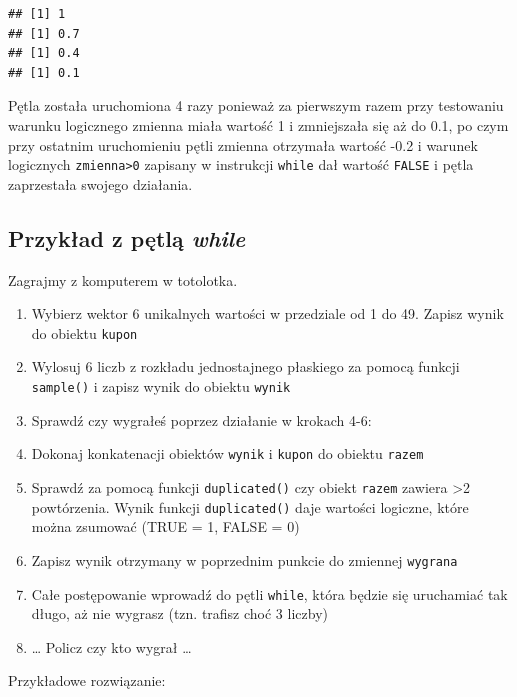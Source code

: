\documentclass[]{book}
\providecommand{\tightlist}{%
  \setlength{\itemsep}{0pt}\setlength{\parskip}{0pt}}
\theoremstyle{definition}
\theoremstyle{definition}
\theoremstyle{definition}
\theoremstyle{remark}
\begin{document}
\begin{verbatim}
## [1] 1
## [1] 0.7
## [1] 0.4
## [1] 0.1
\end{verbatim}

Pętla została uruchomiona 4 razy ponieważ za pierwszym razem przy
testowaniu warunku logicznego zmienna miała wartość 1 i zmniejszała się
aż do 0.1, po czym przy ostatnim uruchomieniu pętli zmienna otrzymała
wartość -0.2 i warunek logicznych \texttt{zmienna\textgreater{}0}
zapisany w instrukcji \texttt{while} dał wartość \texttt{FALSE} i pętla
zaprzestała swojego działania.

\subsection{\texorpdfstring{Przykład z pętlą
\emph{while}}{Przykład z pętlą while}}\label{przykad-z-petla-while}

Zagrajmy z komputerem w totolotka.

\begin{enumerate}
\def\labelenumi{\arabic{enumi}.}
\tightlist
\item
  Wybierz wektor 6 unikalnych wartości w przedziale od 1 do 49. Zapisz
  wynik do obiektu \texttt{kupon}
\item
  Wylosuj 6 liczb z rozkładu jednostajnego płaskiego za pomocą funkcji
  \texttt{sample()} i zapisz wynik do obiektu \texttt{wynik}
\item
  Sprawdź czy wygrałeś poprzez działanie w krokach 4-6:
\item
  Dokonaj konkatenacji obiektów \texttt{wynik} i \texttt{kupon} do
  obiektu \texttt{razem}
\item
  Sprawdź za pomocą funkcji \texttt{duplicated()} czy obiekt
  \texttt{razem} zawiera \textgreater{}2 powtórzenia. Wynik funkcji
  \texttt{duplicated()} daje wartości logiczne, które można zsumować
  (TRUE = 1, FALSE = 0)
\item
  Zapisz wynik otrzymany w poprzednim punkcie do zmiennej
  \texttt{wygrana}
\item
  Całe postępowanie wprowadź do pętli \texttt{while}, która będzie się
  uruchamiać tak długo, aż nie wygrasz (tzn. trafisz choć 3 liczby)
\item
  \ldots{} Policz czy kto wygrał \ldots{}
\end{enumerate}

Przykładowe rozwiązanie:
\end{document}
